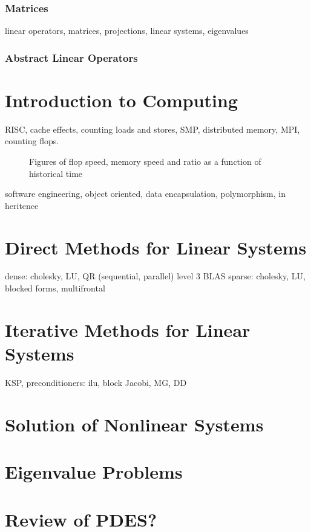 \subsection{Matrices}
linear operators, matrices, projections, linear systems, eigenvalues

\subsection{Abstract Linear Operators}



\chapter{Introduction to Computing}
\label{chapter:itse}
RISC, cache effects, counting loads and stores, SMP, distributed memory, MPI, counting
flops.

\begin{figure}
Figures of flop speed, memory speed and ratio as a function of historical time
\end{figure}

software engineering, object oriented, data encapsulation, 
polymorphism, in heritence

\chapter{Direct Methods for Linear Systems}
\label{chapter:dmftsols}

dense: cholesky, LU, QR (sequential, parallel) level 3 BLAS
sparse: cholesky, LU, blocked forms, multifrontal

\chapter{Iterative Methods for Linear Systems}
\label{chapter:dmftsols}

KSP,
preconditioners: ilu, block Jacobi, MG, DD

\chapter{Solution of Nonlinear Systems}
\label{chapter:sons}

\chapter{Eigenvalue Problems}
\label{chapter:ep}

\chapter{Review of PDES?}


